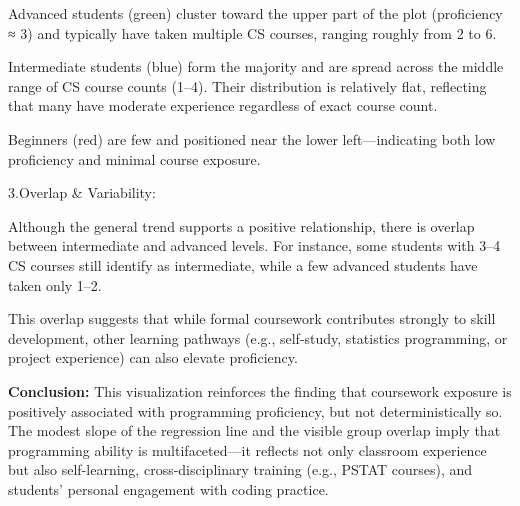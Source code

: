 \documentclass[
  letterpaper,
  DIV=11,
  numbers=noendperiod]{scrartcl}
\begin{document}
Advanced students (green) cluster toward the upper part of the plot
(proficiency ≈ 3) and typically have taken multiple CS courses, ranging
roughly from 2 to 6.

Intermediate students (blue) form the majority and are spread across the
middle range of CS course counts (1--4). Their distribution is
relatively flat, reflecting that many have moderate experience
regardless of exact course count.

Beginners (red) are few and positioned near the lower left---indicating
both low proficiency and minimal course exposure.

3.Overlap \& Variability:

Although the general trend supports a positive relationship, there is
overlap between intermediate and advanced levels. For instance, some
students with 3--4 CS courses still identify as intermediate, while a
few advanced students have taken only 1--2.

This overlap suggests that while formal coursework contributes strongly
to skill development, other learning pathways (e.g., self-study,
statistics programming, or project experience) can also elevate
proficiency.

\textbf{Conclusion:} This visualization reinforces the finding that
coursework exposure is positively associated with programming
proficiency, but not deterministically so. The modest slope of the
regression line and the visible group overlap imply that programming
ability is multifaceted---it reflects not only classroom experience but
also self-learning, cross-disciplinary training (e.g., PSTAT courses),
and students' personal engagement with coding practice.
\end{document}
